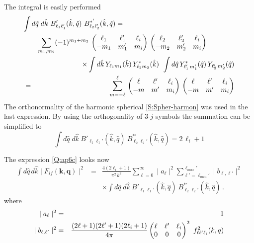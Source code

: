 The integral  is easily performed
\begin{eqnarray*}
\lefteqn{\int d \hat{q} \;d \hat{k}  \ B'_{\ell_{1} \ell_{1}'}
(\hat{k}, \hat{q})  \ B^{*'}_{\ell_{2} \ell_{2}'}(\hat{k}, \hat{q})=}
\\
&&\sum_{m_{1},m_{2}} (-1)^{m_{1}+m_{2}} \,\left( \begin{matrix}\ell_{1} &
\ell_{1}' & \ell_{i} \cr -m_{1} & m'_{1} & m_{i}
\end{matrix}
\right) \, \left(
\begin{matrix}\ell_{2} &
\ell_{2}' & \ell_{i} \cr -m_{2} & m'_{2} & m_{i}
\end{matrix}
\right) \qquad \qquad
\\
&& {\times} \int d \hat{k} \,Y_{\ell_{1} m_{1}}(\hat{k})\, Y^{*}_{\ell_{2}
m_{2}}(\hat{k})\, \; \int d \hat{q} \,
Y^{*}_{\ell_{1}'\,m_{1}'}(\hat{q})
\, Y_{\ell_{2}'\,m_{2}'}(\hat{q}) \\
&=& \sum_{m=-\ell}^{\ell} \, \left( \begin{matrix}\ell & \ell' & \ell_{i} \cr
-m & m' & m_{i}
\end{matrix}
\right) \, \left( \begin{matrix}\ell & \ell' & \ell_{i} \cr
-m & m' & m_{i}
\end{matrix}
\right)
\end{eqnarray*}
The orthonormality of the harmonic spherical \ref{S:Spher-harmon} was
used in the last expression. By using the orthogonality of 3-$j$
symbols the summation can be simplified to
\[
\int d \hat{q} \;d \hat{k}  \ B'_{\ell_{1} \ell_{1}'} (\hat{k},
\hat{q})  \ B^{*'}_{\ell_{2} \ell_{2}'}(\hat{k}, \hat{q}) = 2 \,
\ell_{i} + 1
\]

The expression \ref{Q:ap6c} looks now
\begin{eqnarray*}
\int d \hat{q} \, d \hat{k} \mid F_{if}(\bm{k},\bm{q})\mid ^{2}
&=& \frac{4 ( 2 \ell_{i} + 1)}{\pi^{2} \, k^{2}}
\sum_{\ell=0}^{\infty} \mid a_{\ell}\mid ^{2}
\sum_{\ell'=\ell_{min}'}^{\ell_{max}'} \mid b_{\ell,\ell'}\mid ^{2}
\nonumber
\\
&& {\times} \int d \hat{q} \;d \hat{k}  \ B'_{\ell_{1} \ell_{1}'}
(\hat{k}, \hat{q})  \ B^{*'}_{\ell_{2} \ell_{2}'}(\hat{k}, \hat{q}) \,
.
\end{eqnarray*}
where
\begin{eqnarray}
\mid a_{\ell}\mid ^{2} &=& 1 \\
\mid b_{\ell,\ell'}\mid ^{2} &=& \frac{(2 \ell + 1)(2 \ell' + 1)(2
\ell_{i} + 1)}{4 \pi} \left( \begin{matrix}\ell & \ell' & \ell_{i} \cr 0 & 0
& 0
\end{matrix}
\right)^{2} \ f_{\ell \ell' \ell_{i}}^{2}(k,q)
\end{eqnarray}
